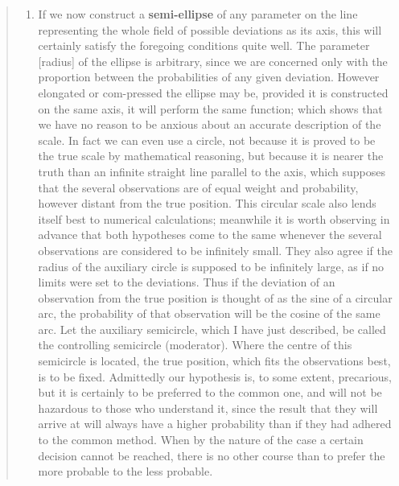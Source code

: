 \documentclass[]{book}
\providecommand{\tightlist}{%
  \setlength{\itemsep}{0pt}\setlength{\parskip}{0pt}}
\begin{document}
\begin{quote}
\begin{enumerate}
\def\labelenumi{\arabic{enumi}.}
\setcounter{enumi}{7}
\tightlist
\item
  If we now construct a \textbf{semi-ellipse} of any parameter on the line representing the whole field of possible deviations as its axis, this will certainly satisfy the foregoing conditions quite well. The parameter {[}radius{]} of the ellipse is arbitrary, since we are concerned only with the proportion between the probabilities of any given deviation. However elongated or com-pressed the ellipse may be, provided it is constructed on the same axis, it will perform the same function; which shows that we have no reason to be anxious about an accurate description of the scale. In fact we can even use a circle, not because it is proved to be the true scale by mathematical reasoning, but because it is nearer the truth than an infinite straight line parallel to the axis, which supposes that the several observations are of equal weight and probability, however distant from the true position. This circular scale also lends itself best to numerical calculations; meanwhile it is worth observing in advance that both hypotheses come to the same whenever the several observations are considered to be infinitely small. They also agree if the radius of the auxiliary circle is supposed to be infinitely large, as if no limits were set to the deviations. Thus if the deviation of an observation from the true position is thought of as the sine of a circular arc, the probability of that observation will be the cosine of the same arc. Let the auxiliary semicircle, which I have just described, be called the controlling semicircle (moderator). Where the centre of this semicircle is located, the true position, which fits the observations best, is to be fixed. Admittedly our hypothesis is, to some extent, precarious, but it is certainly to be preferred to the common one, and will not be hazardous to those who understand it, since the result that they will arrive at will always have a higher probability than if they had adhered to the common method. When by the nature of the case a certain decision cannot be reached, there is no other course than to prefer the more probable to the less probable.
\end{enumerate}
\end{quote}
\end{document}
